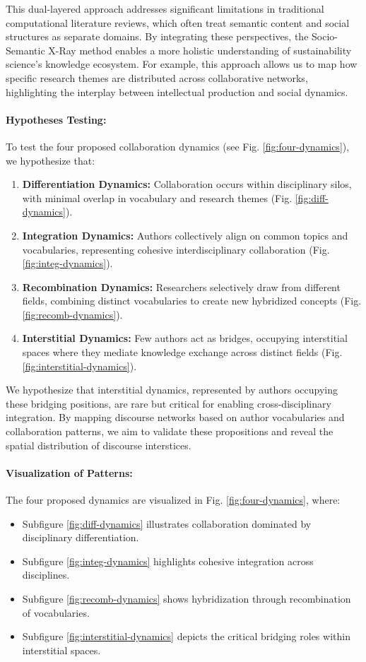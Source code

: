 \documentclass[12pt]{article}
\begin{document}
This dual-layered approach addresses significant limitations in traditional computational literature reviews, which often treat semantic content and social structures as separate domains. By integrating these perspectives, the Socio-Semantic X-Ray method enables a more holistic understanding of sustainability science’s knowledge ecosystem. For example, this approach allows us to map how specific research themes are distributed across collaborative networks, highlighting the interplay between intellectual production and social dynamics.

\paragraph{Hypotheses Testing:}
To test the four proposed collaboration dynamics (see Fig. \ref{fig:four-dynamics}), we hypothesize that:
\begin{enumerate}
    \item \textbf{Differentiation Dynamics:} Collaboration occurs within disciplinary silos, with minimal overlap in vocabulary and research themes (Fig. \ref{fig:diff-dynamics}).
    \item \textbf{Integration Dynamics:} Authors collectively align on common topics and vocabularies, representing cohesive interdisciplinary collaboration (Fig. \ref{fig:integ-dynamics}).
    \item \textbf{Recombination Dynamics:} Researchers selectively draw from different fields, combining distinct vocabularies to create new hybridized concepts (Fig. \ref{fig:recomb-dynamics}).
    \item \textbf{Interstitial Dynamics:} Few authors act as bridges, occupying interstitial spaces where they mediate knowledge exchange across distinct fields (Fig. \ref{fig:interstitial-dynamics}).
\end{enumerate}

We hypothesize that interstitial dynamics, represented by authors occupying these bridging positions, are rare but critical for enabling cross-disciplinary integration. By mapping discourse networks based on author vocabularies and collaboration patterns, we aim to validate these propositions and reveal the spatial distribution of discourse interstices.

\paragraph{Visualization of Patterns:}
The four proposed dynamics are visualized in Fig. \ref{fig:four-dynamics}, where:
\begin{itemize}
    \item Subfigure \ref{fig:diff-dynamics} illustrates collaboration dominated by disciplinary differentiation.
    \item Subfigure \ref{fig:integ-dynamics} highlights cohesive integration across disciplines.
    \item Subfigure \ref{fig:recomb-dynamics} shows hybridization through recombination of vocabularies.
    \item Subfigure \ref{fig:interstitial-dynamics} depicts the critical bridging roles within interstitial spaces.
\end{itemize}
\end{document}
